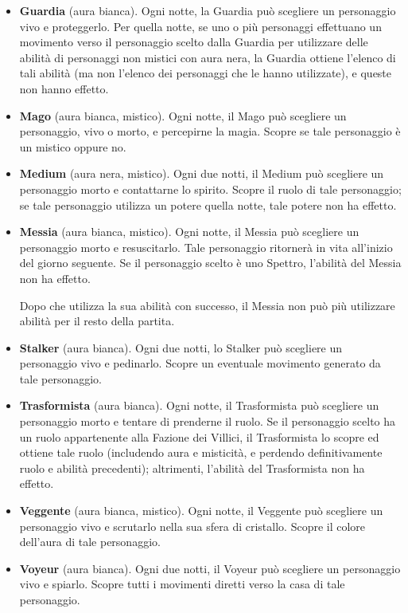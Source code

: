 \documentclass[a4paper,10pt]{article}
\begin{document}
\begin{itemize}
	\item {\bf Guardia} (aura bianca). Ogni notte, la Guardia può scegliere un personaggio vivo e proteggerlo. Per quella notte, se uno o più personaggi effettuano un movimento verso il personaggio scelto dalla Guardia per utilizzare delle abilità di personaggi non mistici con aura nera, la Guardia ottiene l'elenco di tali abilità (ma non l'elenco dei personaggi che le hanno utilizzate), e queste non hanno effetto.

	\item {\bf Mago} (aura bianca, mistico). Ogni notte, il Mago può scegliere un personaggio, vivo o morto, e percepirne la magia. Scopre se tale personaggio è un mistico oppure no.

	\item {\bf Medium} (aura nera, mistico). Ogni due notti, il Medium può scegliere un personaggio morto e contattarne lo spirito. Scopre il ruolo di tale personaggio; se tale personaggio utilizza un potere quella notte, tale potere non ha effetto.

	\item {\bf Messia} (aura bianca, mistico). Ogni notte, il Messia può scegliere un personaggio morto e resuscitarlo. Tale personaggio ritornerà in vita all'inizio del giorno seguente. Se il personaggio scelto è uno Spettro, l'abilità del Messia non ha effetto.

	      Dopo che utilizza la sua abilità con successo, il Messia non può più utilizzare abilità per il resto della partita.

	\item {\bf Stalker} (aura bianca). Ogni due notti, lo Stalker può scegliere un personaggio vivo e pedinarlo. Scopre un eventuale movimento generato da tale personaggio.

	\item {\bf Trasformista} (aura bianca). Ogni notte, il Trasformista può scegliere un personaggio morto e tentare di prenderne il ruolo. Se il personaggio scelto ha un ruolo appartenente alla Fazione dei Villici, il Trasformista lo scopre ed ottiene tale ruolo (includendo aura e misticità, e perdendo definitivamente ruolo e abilità precedenti); altrimenti, l'abilità del Trasformista non ha effetto.

	\item {\bf Veggente} (aura bianca, mistico). Ogni notte, il Veggente può scegliere un personaggio vivo e scrutarlo nella sua sfera di cristallo. Scopre il colore dell'aura di tale personaggio.

	\item {\bf Voyeur} (aura bianca). Ogni due notti, il Voyeur può scegliere un personaggio vivo e spiarlo. Scopre tutti i movimenti diretti verso la casa di tale personaggio.

\end{itemize}
\end{document}
